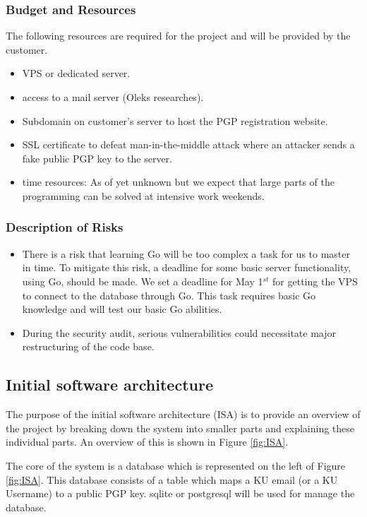 \documentclass[11pt,a4paper]{report}
\begin{document}
\subsubsection{Budget and Resources}
The following resources are required for the project and will be provided by the customer.
\begin{itemize}
\item VPS or dedicated server.
\item access to a mail server (Oleks researches).
\item Subdomain on customer's server to host the PGP registration website.
\item SSL certificate to defeat man-in-the-middle attack where an attacker sends a fake public PGP key to the server.
\item time resources: As of yet unknown but we expect that large parts of the programming can be solved at intensive work weekends.
\end{itemize}
\subsubsection{Description of Risks}
\begin{itemize}
\item There is a risk that learning Go will be too complex a task for us to master in time. To mitigate this risk, a deadline for some basic server functionality, using Go, should be made. We set a deadline for May 1$^{st}$ for getting the VPS to connect to the database through Go. This task requires basic Go knowledge and will test our basic Go abilities.
\item During the security audit, serious vulnerabilities could necessitate major restructuring of the code base.
\end{itemize}
\newpage
\subsection{Initial software architecture}
The purpose of the initial software architecture (ISA) is to provide an overview of the project by breaking down the system into smaller parts and explaining these individual parts. An overview of this is shown in Figure  \ref{fig:ISA}.

The core of the system is a database which is represented on the left of Figure  \ref{fig:ISA}. This database consists of a table which maps a KU email (or a KU Username) to a public PGP key. sqlite or postgresql will be used for manage the database.
\end{document}
